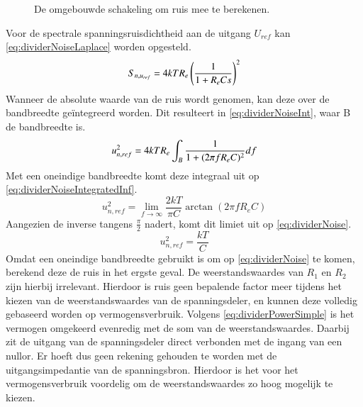 \begin{figure}[ht]
    \centering
    \def\svgwidth{0.35\textwidth}
    
    \caption{De omgebouwde schakeling om ruis mee te berekenen.}
    \label{fig:dividerNoise}
\end{figure}

\noindent
Voor de spectrale spanningsruisdichtheid aan de uitgang $U_{ref}$ kan \autoref{eq:dividerNoiseLaplace} worden opgesteld.
\begin{equation}\label{eq:dividerNoiseLaplace}
    S_{n,u_{ref}} = 4kTR_e\left(\frac{1}{1 + R_eCs}\right)^2
    \tagaddtext{[\si{\volt\squared\per\hertz}]}
\end{equation}
Wanneer de absolute waarde van de ruis wordt genomen, kan deze over de bandbreedte geïntegreerd worden. Dit resulteert in \autoref{eq:dividerNoiseInt}, waar B de bandbreedte is.
\begin{equation}\label{eq:dividerNoiseInt}
    u_{n,ref}^2 = 4kTR_e\int_{B} \frac{1}{1 + (2\pi f R_e C)^2} df
    \tagaddtext{[\si{\volt\squared}]}
\end{equation}
Met een oneindige bandbreedte komt deze integraal uit op \autoref{eq:dividerNoiseIntegratedInf}.
\begin{equation}\label{eq:dividerNoiseIntegratedInf}
    u_{n,ref}^2 = \lim_{f\rightarrow\infty}\frac{2kT}{\pi C} \arctan(2\pi f R_eC)
\end{equation}
Aangezien de inverse tangens $\frac{\pi}{2}$ nadert, komt dit limiet uit op \autoref{eq:dividerNoise}.
\begin{equation}\label{eq:dividerNoise}
    u_{n,ref}^2 = \frac{kT}{C}
\end{equation}
Omdat een oneindige bandbreedte gebruikt is om op \autoref{eq:dividerNoise} te komen, berekend deze de ruis in het ergste geval. De weerstandswaardes van $R_1$ en $R_2$ zijn hierbij irrelevant. Hierdoor is ruis geen bepalende factor meer tijdens het kiezen van de weerstandswaardes van de spanningsdeler, en kunnen deze volledig gebaseerd worden op vermogensverbruik. Volgens \cref{eq:dividerPowerSimple} is het vermogen omgekeerd evenredig met de som van de weerstandswaardes. Daarbij zit de uitgang van de spanningsdeler direct verbonden met de ingang van een nullor. Er hoeft dus geen rekening gehouden te worden met de uitgangsimpedantie van de spanningsbron. Hierdoor is het voor het vermogensverbruik voordelig om de weerstandswaardes zo hoog mogelijk te kiezen.




